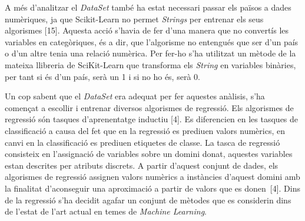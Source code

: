 \documentclass[10pt,a4paper,twocolumn,twoside]{article}
\begin{document}
A més d'analitzar el \textit{DataSet} també ha estat necessari passar els països a dades numèriques, ja que Scikit-Learn no permet \textit{Strings} per entrenar els seus algorismes [15]. Aquesta acció s'havia de fer d'una manera que no convertís les variables en categòriques, és a dir, que l'algorisme no entengués que ser d'un país o d'un altre tenia una relació numèrica. Per fer-ho s'ha utilitzat un mètode de la mateixa llibreria de SciKit-Learn que transforma els \textit{String} en variables binàries, per tant si és d'un país, serà un 1 i si no ho és, serà 0.

Un cop sabent que el \textit{DataSet} era adequat per fer aquestes anàlisis, s'ha començat a escollir i entrenar diversos algorismes de regressió. Els algorismes de regressió són tasques d'aprenentatge inductiu [4]. Es diferencien en les tasques de classificació a causa del fet que en la regressió es prediuen valors numèrics, en canvi en la classificació es prediuen etiquetes de classe. La tasca de regressió consisteix en l'assignació de variables sobre un domini donat, aquestes variables estan descrites per atributs discrets. A partir d'aquest conjunt de dades, els algorismes de regressió assignen valors numèrics a instàncies d'aquest domini amb la finalitat d'aconseguir una aproximació a partir de valors que es donen~[4]. Dins de la regressió s'ha decidit agafar un conjunt de mètodes que es considerin dins de l'estat de l'art actual en temes de \textit{Machine Learning}.
\end{document}
